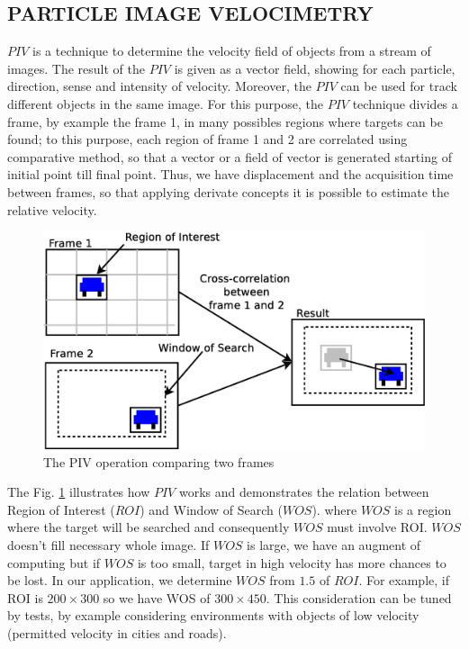 
\subsection{PARTICLE IMAGE VELOCIMETRY}

$PIV$ is a technique to determine the  velocity field of objects from a stream of images\cite{Bastiaans}.
The result of the $PIV$ is given as a vector field, showing for each particle, direction, sense and intensity of velocity. 
Moreover, the $PIV$ can be used for track different objects in the same image.
For this purpose, the $PIV$ technique divides a frame, by example the frame 1, in many possibles regions where targets can be found; 
to this purpose, each region of frame 1 and 2 are correlated using comparative method, 
so that a vector or a field of vector is generated 
starting of initial point till final point. Thus, we have displacement and the acquisition time between frames, 
so that applying derivate concepts it is possible to estimate the relative velocity.

\begin{figure}[H]
\includegraphics[width=\columnwidth]{images/explanationPIV.eps}
\caption{The PIV operation comparing two frames}
\label{fig:twoframes}
\end{figure}

The Fig. \ref{fig:twoframes} illustrates how $PIV$ works and demonstrates the relation between Region of Interest ($ROI$) and 
Window of Search ($WOS$). where $WOS$ is a region where the target will be searched and consequently $WOS$ must involve ROI. 
$WOS$ doesn't fill necessary whole image. If $WOS$ is large, we have an augment of computing but 
if $WOS$ is too small, target in high velocity has more chances to be lost. In our application, 
we determine $WOS$ from $1.5$ of $ROI$. For example, if ROI is $200\times300$ so we have WOS of $300\times450$. 
This consideration can be tuned by tests, by example considering environments with objects
of low velocity (permitted velocity in cities and roads).

